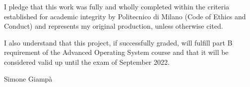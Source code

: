 \documentclass[10pt]{article}
\begin{document}
I pledge that this work was fully and wholly completed within the criteria established for academic integrity by Politecnico di Milano
(Code of Ethics and Conduct) and represents my original production, unless otherwise cited.

I also understand that this project, if successfully graded, will fulfill part B requirement of the Advanced Operating System course
and that it will be considered valid up until the exam of September 2022. 

\begin{flushright}
Simone Giampà
\end{flushright}
\end{document}

